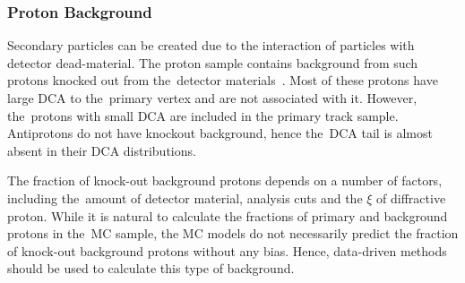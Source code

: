 \subsubsection{Proton Background}\label{section:star_background_proton}
Secondary particles can be created due to the interaction of particles with detector dead-material.
The proton sample contains background from such protons knocked out  from the~detector materials~\cite{STAR:spectra}. Most of these protons have large $\textrm{DCA}$ to the~primary vertex and are not associated with it. However, the~protons with small $\textrm{DCA}$  are included in the primary track sample. Antiprotons do not have knockout background, hence the~$\textrm{DCA}$ tail is almost absent in their $\textrm{DCA}$ distributions.

The fraction of knock-out background protons depends on a number of factors, including the~amount of detector material, analysis cuts and the $\xi$ of diffractive proton. While it is natural to calculate the fractions of primary and background protons in the~\ac{MC} sample, the \ac{MC} models do not necessarily predict the fraction of knock-out background protons without any bias. Hence,  data-driven methods should be used to calculate this type of background.

